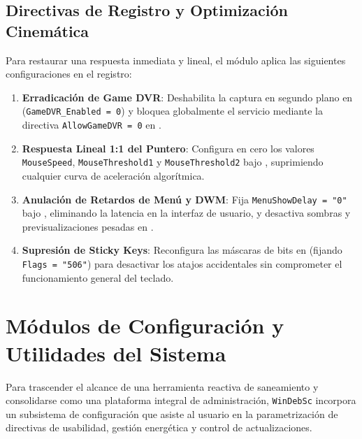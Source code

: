 \documentclass[12pt,a4paper]{report}
\begin{document}
\subsection{Directivas de Registro y Optimización Cinemática}
Para restaurar una respuesta inmediata y lineal, el módulo aplica las siguientes configuraciones en el registro:
\begin{enumerate}
    \item \textbf{Erradicación de Game DVR}: Deshabilita la captura en segundo plano en  (\texttt{GameDVR_Enabled = 0}) y bloquea globalmente el servicio mediante la directiva \texttt{AllowGameDVR = 0} en .
    \item \textbf{Respuesta Lineal 1:1 del Puntero}: Configura en cero los valores \texttt{MouseSpeed}, \texttt{MouseThreshold1} y \texttt{MouseThreshold2} bajo , suprimiendo cualquier curva de aceleración algorítmica.
    \item \textbf{Anulación de Retardos de Menú y DWM}: Fija \texttt{MenuShowDelay = "0"} bajo , eliminando la latencia en la interfaz de usuario, y desactiva sombras y previsualizaciones pesadas en .
    \item \textbf{Supresión de Sticky Keys}: Reconfigura las máscaras de bits en  (fijando \texttt{Flags = "506"}) para desactivar los atajos accidentales sin comprometer el funcionamiento general del teclado.
\end{enumerate}

\section[Módulos de Configuración y Utilidades del Sistema]{Módulos de Configuración y Utilidades del Sistema}
Para trascender el alcance de una herramienta reactiva de saneamiento y consolidarse como una plataforma integral de administración, \texttt{WinDebSc} incorpora un subsistema de configuración que asiste al usuario en la parametrización de directivas de usabilidad, gestión energética y control de actualizaciones.
\end{document}
